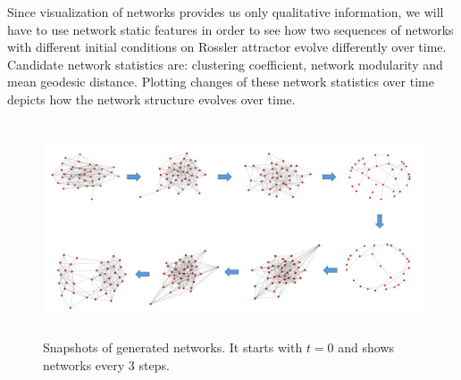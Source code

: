 \documentclass{article}
\begin{document}
Since visualization of networks provides us only qualitative information, we will have to use network static features in order to see how two sequences of networks with different initial conditions on R$\ddot{\text{o}}$ssler attractor evolve differently over time. Candidate network statistics are: clustering coefficient, network modularity and mean geodesic distance. Plotting changes of these network statistics over time depicts how the network structure evolves over time.

\begin{figure}[h]
  \centering
  \includegraphics[height=2.5in]{figs/evolution.png}
  \caption{Snapshots of generated networks. It starts with $t = 0$ and shows networks every 3 steps.}
  \label{1}
\end{figure}


 
\end{document}
